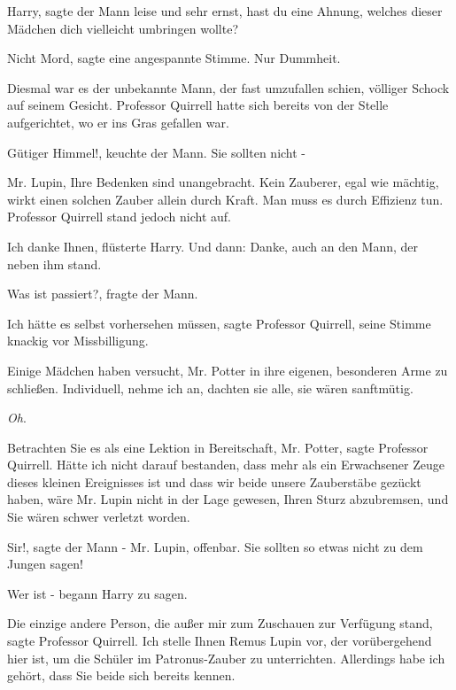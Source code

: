 \glqq{}Harry\grqq{}, sagte der Mann leise und sehr ernst, \glqq{}hast du eine
Ahnung, welches dieser Mädchen dich vielleicht umbringen wollte?\grqq{}

\glqq{}Nicht Mord\grqq{}, sagte eine angespannte Stimme. \glqq{}Nur Dummheit.\grqq{}

Diesmal war es der unbekannte Mann, der fast umzufallen schien, völliger Schock
auf seinem Gesicht. Professor Quirrell hatte sich bereits von der Stelle
aufgerichtet, wo er ins Gras gefallen war.

\glqq{}Gütiger Himmel!\grqq{}, keuchte der Mann. \glqq{}Sie sollten nicht -\grqq{}

\glqq{}Mr. Lupin, Ihre Bedenken sind unangebracht. Kein Zauberer, egal wie
mächtig, wirkt einen solchen Zauber allein durch Kraft. Man muss es durch
Effizienz tun.\grqq{} Professor Quirrell stand jedoch nicht auf.

\glqq{}Ich danke Ihnen\grqq{}, flüsterte Harry. Und dann: \glqq{}Danke\grqq{},
auch an den Mann, der neben ihm stand.

\glqq{}Was ist passiert?\grqq{}, fragte der Mann.

\glqq{}Ich hätte es selbst vorhersehen müssen\grqq{}, sagte Professor Quirrell,
seine Stimme knackig vor Missbilligung.

\glqq{}Einige Mädchen haben versucht, Mr. Potter in ihre eigenen, besonderen Arme
zu schließen. Individuell, nehme ich an, dachten sie alle, sie wären
sanftmütig.\grqq{}

\emph{Oh}.

\glqq{}Betrachten Sie es als eine Lektion in Bereitschaft, Mr. Potter\grqq{},
sagte Professor Quirrell. \glqq{}Hätte ich nicht darauf bestanden, dass mehr als
ein Erwachsener Zeuge dieses kleinen Ereignisses ist und dass wir beide unsere
Zauberstäbe gezückt haben, wäre Mr. Lupin nicht in der Lage gewesen, Ihren Sturz
abzubremsen, und Sie wären schwer verletzt worden.\grqq{}

\glqq{}Sir!\grqq{}, sagte der Mann - Mr. Lupin, offenbar. \glqq{}Sie sollten so
etwas nicht zu dem Jungen sagen!\grqq{}

\glqq{}Wer ist -\grqq{} begann Harry zu sagen.

\glqq{}Die einzige andere Person, die außer mir zum Zuschauen zur Verfügung
stand\grqq{}, sagte Professor Quirrell. \glqq{}Ich stelle Ihnen Remus Lupin vor,
der vorübergehend hier ist, um die Schüler im Patronus-Zauber zu unterrichten.
Allerdings habe ich gehört, dass Sie beide sich bereits kennen.\grqq{}

